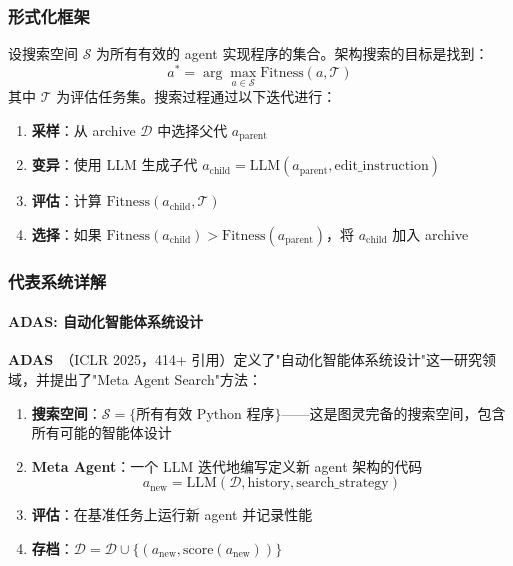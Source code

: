 \subsubsection{形式化框架}

\begin{definition}[架构搜索框架]
设搜索空间 $\mathcal{S}$ 为所有有效的 agent 实现程序的集合。架构搜索的目标是找到：
\begin{equation}
a^* = \arg\max_{a \in \mathcal{S}} \text{Fitness}(a, \mathcal{T})
\label{eq:arch-search}
\end{equation}
其中 $\mathcal{T}$ 为评估任务集。搜索过程通过以下迭代进行：
\begin{enumerate}
\item \textbf{采样}：从 archive $\mathcal{D}$ 中选择父代 $a_{\mathrm{parent}}$
\item \textbf{变异}：使用 LLM 生成子代 $a_{\mathrm{child}} = \mathrm{LLM}(a_{\mathrm{parent}}, \text{edit\_instruction})$
\item \textbf{评估}：计算 $\text{Fitness}(a_{\mathrm{child}}, \mathcal{T})$
\item \textbf{选择}：如果 $\text{Fitness}(a_{\mathrm{child}}) > \text{Fitness}(a_{\mathrm{parent}})$，将 $a_{\mathrm{child}}$ 加入 archive
\end{enumerate}
\end{definition}

\subsubsection{代表系统详解}

\paragraph{ADAS: 自动化智能体系统设计}

\textbf{ADAS}~\citep{adas2025}（ICLR 2025，414+ 引用）定义了"自动化智能体系统设计"这一研究领域，并提出了"Meta Agent Search"方法：

\begin{enumerate}
\item \textbf{搜索空间}：$\mathcal{S} = \{\text{所有有效 Python 程序}\}$——这是图灵完备的搜索空间，包含所有可能的智能体设计
\item \textbf{Meta Agent}：一个 LLM 迭代地编写定义新 agent 架构的代码
\begin{equation}
a_{\mathrm{new}} = \mathrm{LLM}(\mathcal{D}, \text{history}, \text{search\_strategy})
\label{eq:adas-search}
\end{equation}
\item \textbf{评估}：在基准任务上运行新 agent 并记录性能
\item \textbf{存档}：$\mathcal{D} = \mathcal{D} \cup \{(a_{\mathrm{new}}, \text{score}(a_{\mathrm{new}}))\}$
\end{enumerate}

